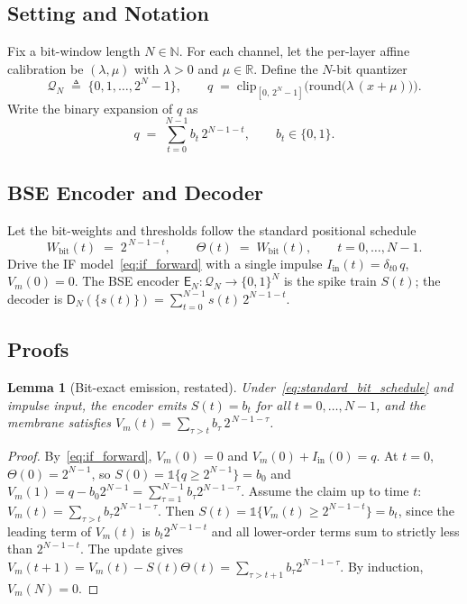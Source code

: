 \documentclass{article}
\theoremstyle{plain}
\newtheorem{lemma}[theorem]{Lemma}
\theoremstyle{definition}
\theoremstyle{remark}
\begin{document}
\subsection{Setting and Notation}
\label{app:bse_setting}

Fix a bit-window length $N \in \mathbb{N}$. For each channel, let the
per-layer affine calibration be $(\lambda, \mu)$ with $\lambda > 0$ and
$\mu \in \mathbb{R}$. Define the $N$-bit quantizer
\begin{equation}
\label{eq:quantizer_grid_def}
\mathcal{Q}_N \;\triangleq\; \{0, 1, \dots, 2^N - 1\},
\qquad
q \;=\; \mathrm{clip}_{[0,\,2^N-1]}\!\Big(\mathrm{round}\big(\lambda\,(x+\mu)\big)\Big).
\end{equation}
Write the binary expansion of $q$ as
\begin{equation}
\label{eq:binary_expansion_def}
q \;=\; \sum_{t=0}^{N-1} b_t\,2^{N-1-t}, \qquad b_t \in \{0,1\}.
\end{equation}

\subsection{BSE Encoder and Decoder}
\label{app:bse_encdec}

Let the bit-weights and thresholds follow the standard positional schedule
\begin{equation}
\label{eq:standard_bit_schedule}
W_{\mathrm{bit}}(t) \;=\; 2^{\,N-1-t},
\qquad
\Theta(t) \;=\; W_{\mathrm{bit}}(t),
\qquad t = 0, \dots, N-1.
\end{equation}
Drive the IF model~\eqref{eq:if_forward} with a single impulse
$I_{\mathrm{in}}(t) = \delta_{t0}\,q$, $V_m(0) = 0$. The BSE encoder
$\mathsf{E}_N : \mathcal{Q}_N \to \{0,1\}^N$ is the spike train $S(t)$; the
decoder is $\mathsf{D}_N(\{s(t)\}) = \sum_{t=0}^{N-1} s(t)\,2^{N-1-t}$.

\subsection{Proofs}
\label{app:bse_proofs}

\begin{lemma}[Bit-exact emission, restated]
\label{lem:bit_exact}
Under~\eqref{eq:standard_bit_schedule} and impulse input, the encoder emits
$S(t) = b_t$ for all $t = 0, \dots, N-1$, and the membrane satisfies
$V_m(t) = \sum_{\tau > t} b_\tau\,2^{\,N-1-\tau}$.
\end{lemma}

\begin{proof}
By~\eqref{eq:if_forward}, $V_m(0) = 0$ and $V_m(0) + I_{\mathrm{in}}(0) = q$.
At $t=0$, $\Theta(0) = 2^{N-1}$, so
$S(0) = \mathbb{1}\{q \ge 2^{N-1}\} = b_0$ and
$V_m(1) = q - b_0 2^{N-1} = \sum_{\tau=1}^{N-1} b_\tau 2^{N-1-\tau}$.
Assume the claim up to time $t$: $V_m(t) = \sum_{\tau>t} b_\tau 2^{N-1-\tau}$.
Then
$S(t) = \mathbb{1}\{V_m(t) \ge 2^{N-1-t}\} = b_t$,
since the leading term of $V_m(t)$ is $b_t 2^{N-1-t}$ and all lower-order
terms sum to strictly less than $2^{N-1-t}$. The update gives
$V_m(t+1) = V_m(t) - S(t)\Theta(t) = \sum_{\tau>t+1} b_\tau 2^{N-1-\tau}$.
By induction, $V_m(N) = 0$.
\end{proof}
\end{document}
